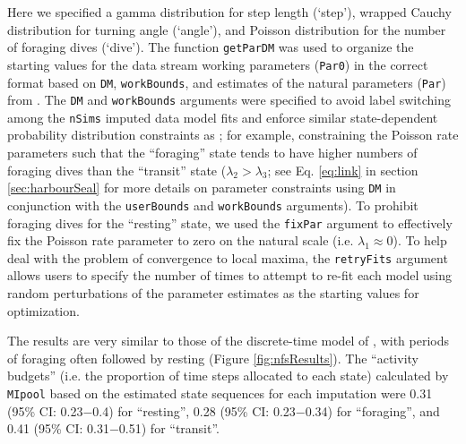 \documentclass[12pt]{article}\usepackage[]{graphicx}\usepackage[]{color}
\begin{document}
Here we specified a gamma distribution for step length (`step'), wrapped Cauchy distribution for turning angle (`angle'), and Poisson distribution for the number of foraging dives (`dive'). The function \verb|getParDM| was used to organize the starting values for the data stream working parameters (\verb|Par0|) in the correct format based on \verb|DM|, \verb|workBounds|, and estimates of the natural parameters (\verb|Par|) from \cite{McClintockEtAl2014b}. The \verb|DM| and \verb|workBounds| arguments were specified to avoid label switching among the \verb|nSims| imputed data model fits and enforce similar state-dependent probability distribution constraints as \cite{McClintockEtAl2014b}; for example, constraining the Poisson rate parameters such that the ``foraging'' state tends to have higher numbers of foraging dives than the ``transit'' state ($\lambda_2 > \lambda_3$; see Eq. \ref{eq:link} in section \ref{sec:harbourSeal} for more details on parameter constraints using \verb|DM| in conjunction with the \verb|userBounds| and \verb|workBounds| arguments). To prohibit foraging dives for the ``resting'' state, we used the \verb|fixPar| argument to effectively fix the Poisson rate parameter to zero on the natural scale (i.e. $\lambda_1 \approx 0$).  To help deal with the problem of convergence to local maxima, the \verb|retryFits| argument allows users to specify the number of times to attempt to re-fit each model using random perturbations of the parameter estimates as the starting values for optimization.

The results are very similar to those of the discrete-time model of \cite{McClintockEtAl2014b}, with periods of foraging often followed by resting (Figure \ref{fig:nfsResults}).  The ``activity budgets'' (i.e. the proportion of time steps allocated to each state) calculated by \verb|MIpool| based on the estimated state sequences for each imputation were 0.31 (95\% CI: 0.23$-$0.4) for ``resting'', 0.28 (95\% CI: 0.23$-$0.34) for ``foraging'', and 0.41 (95\% CI: 0.31$-$0.51) for ``transit''.
\end{document}
